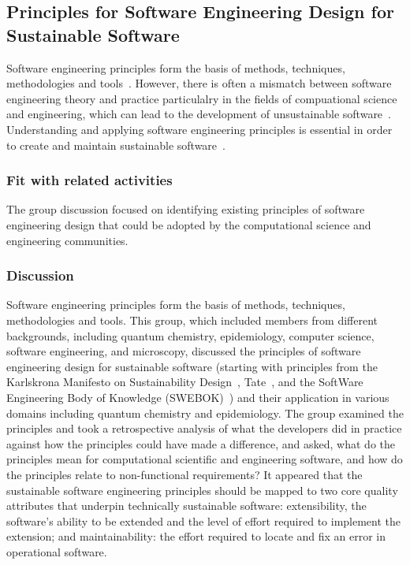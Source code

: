 \subsection{Principles for Software Engineering Design for Sustainable Software} 


Software engineering principles form the basis of methods, techniques, methodologies and tools~\cite{Vliet:2008}. However, there is often a mismatch between software engineering theory and practice particulalry in the fields of compuational science and engineering, which can lead to the development of unsustainable software~\cite{Merali:2010,hettrick:2014}. Understanding and applying software engineering principles is essential in order to create and maintain sustainable software~\cite{Becker:2016}.

\subsubsection{Fit with related activities}
The group discussion focused on identifying existing principles of software engineering design that could be adopted by the computational science and engineering communities.

\subsubsection{Discussion}

Software engineering principles form the basis of methods, techniques, methodologies and tools. This group, which included members from different backgrounds, including quantum chemistry, epidemiology, computer science, software engineering, and microscopy, discussed the principles of software engineering design for sustainable software (starting with principles from the Karlskrona Manifesto on Sustainability Design~\cite{Becker:2015}, Tate~\cite{tate:2005}, and the SoftWare Engineering Body of Knowledge (SWEBOK)~\cite{swebokv3}) and their application in various domains including quantum chemistry and epidemiology.  The group examined the principles and took a retrospective analysis of what the developers did in practice against how the principles could have made a difference, and asked, what do the principles mean for  computational scientific and engineering software, and how do the principles relate to non-functional requirements? It
appeared that the sustainable software engineering principles should be mapped to two core quality attributes that underpin technically sustainable software: extensibility, the software's ability to be extended and the level of effort required to implement the extension; and
maintainability: the effort required to locate and fix an error in operational software.

